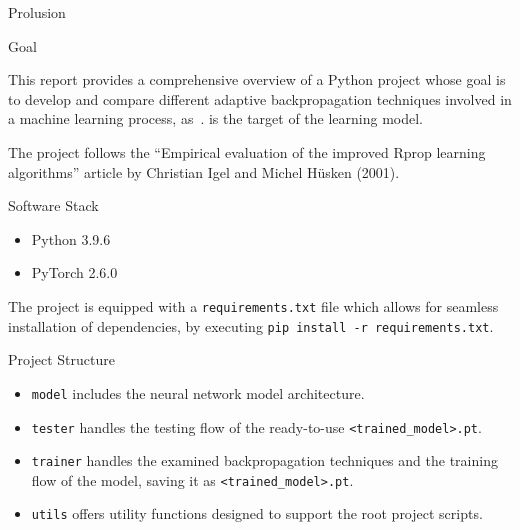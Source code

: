 
\clearpage
\begin{chapter}{Prolusion}
    \begin{section}{Goal}
        \par This report provides a comprehensive overview of a Python project whose goal is to develop and compare different adaptive backpropagation techniques involved in a machine learning process, as~.  is the target of the learning model.
		\par The project follows the ``Empirical evaluation of the improved Rprop learning algorithms'' article by Christian Igel and Michel Hüsken (2001).
    \end{section}
    \newpage
	\begin{section}{Software Stack}
		\begin{itemize}
			\item Python 3.9.6
			\item PyTorch 2.6.0
		\end{itemize}
		The project is equipped with a \texttt{requirements.txt} file which allows for seamless installation of dependencies, by executing \texttt{pip install -r requirements.txt}.
	\end{section}
	\newpage
	\begin{section}{Project Structure}
		\medskip
		\begin{itemize}
			\item \texttt{model} includes the neural network model architecture.
			\item \texttt{tester} handles the testing flow of the ready-to-use \texttt{<trained\_model>.pt}.
			\item \texttt{trainer} handles the examined backpropagation techniques and the training flow of the model, saving it as \texttt{<trained\_model>.pt}.
			\item \texttt{utils} offers utility functions designed to support the root project scripts.
		\end{itemize}
	\end{section}
\end{chapter}